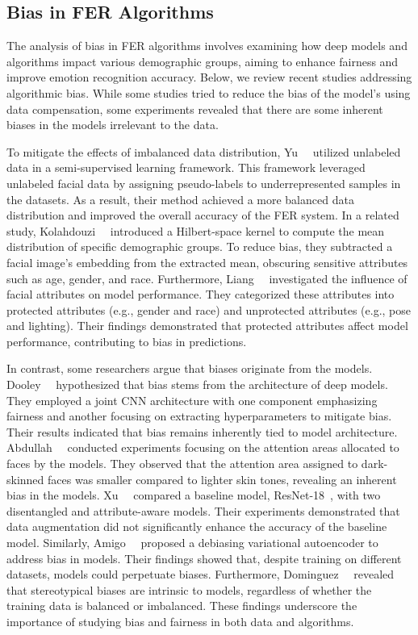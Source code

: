 \subsection{Bias in FER Algorithms} 
\label{sec:literature_review:bias_in_fer_algorithms}
The analysis of bias in  FER algorithms involves examining how deep models and algorithms impact various demographic groups, aiming to enhance fairness and improve emotion recognition accuracy. Below, we review recent studies addressing algorithmic bias. While some studies tried to reduce the bias of the model's using data compensation, some experiments revealed that there are some inherent biases in the models irrelevant to the data.

To mitigate the effects of imbalanced data distribution, Yu~\etal~\cite{yu2023exploring} utilized unlabeled data in a semi-supervised learning framework. This framework leveraged unlabeled facial data by assigning pseudo-labels to underrepresented samples in the datasets. As a result, their method achieved a more balanced data distribution and improved the overall accuracy of the FER system. In a related study, Kolahdouzi~\etal~\cite{kolahdouzi2023toward} introduced a Hilbert-space kernel to compute the mean distribution of specific demographic groups. To reduce bias, they subtracted a facial image's embedding from the extracted mean, obscuring sensitive attributes such as age, gender, and race. Furthermore, Liang~\etal~\cite{liang2023benchmarking} investigated the influence of facial attributes on model performance. They categorized these attributes into protected attributes (e.g., gender and race) and unprotected attributes (e.g., pose and lighting). Their findings demonstrated that protected attributes affect model performance, contributing to bias in predictions.

In contrast, some researchers argue that biases originate from the models. Dooley~\etal~\cite{dooley2024rethinking} hypothesized that bias stems from the architecture of deep models. They employed a joint CNN architecture with one component emphasizing fairness and another focusing on extracting hyperparameters to mitigate bias. Their results indicated that bias remains inherently tied to model architecture. Abdullah~\etal~\cite{abdullah2024effects} conducted experiments focusing on the attention areas allocated to faces by the models. They observed that the attention area assigned to dark-skinned faces was smaller compared to lighter skin tones, revealing an inherent bias in the models. Xu~\etal~\cite{xu2020investigating} compared a baseline model, ResNet-18~\cite{he2016deep}, with two disentangled and attribute-aware models. Their experiments demonstrated that data augmentation did not significantly enhance the accuracy of the baseline model. Similarly, Amigo~\etal~\cite{amigo2023mitigating} proposed a debiasing variational autoencoder to address bias in models. Their findings showed that, despite training on different datasets, models could perpetuate biases. Furthermore, Dominguez~\etal~\cite{dominguez2024less} revealed that stereotypical biases are intrinsic to models, regardless of whether the training data is balanced or imbalanced. These findings underscore the importance of studying bias and fairness in both data and algorithms.

